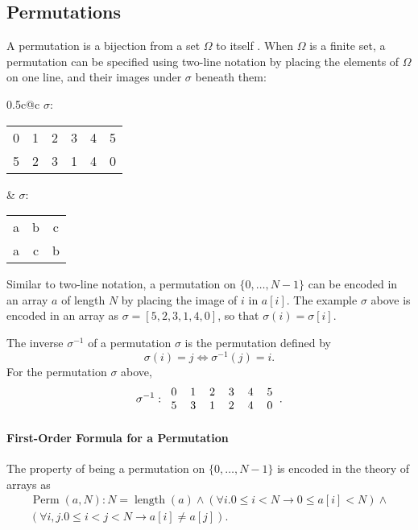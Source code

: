 \documentclass{llncs}
\DeclareMathOperator{\Perm}{Perm}
\DeclareMathOperator{\len}{length}
\begin{document}
\subsection{Permutations}
\label{perms}

A permutation is a bijection from a set \(\Omega\) to itself \cite{dummitfoote}.  When \(\Omega\) is a finite set, a permutation can be specified using two-line notation by placing the elements of \(\Omega\) on one line, and their images under \(\sigma\) beneath them:

\begin{center}
\begin{tabular*}{0.5\textwidth}{c@{\extracolsep{\fill}}c}
\(\sigma\):
\begin{tabular}{cccccc}
0 & 1 & 2 & 3 & 4 & 5\\
5 & 2 & 3 & 1 & 4 & 0
\end{tabular}
&
\(\sigma\):
\begin{tabular}{ccc}
a & b & c\\
a & c & b
\end{tabular}
\end{tabular*}
\end{center}

Similar to two-line notation, a permutation on \(\{0, \dotsc, N-1\}\) can be encoded in an array \(a\) of length \(N\) by placing the image of \(i\) in \(a[i]\).  The example \(\sigma\) above is encoded in an array as \(\sigma = [5, 2, 3, 1, 4, 0]\), so that \(\sigma(i) = \sigma[i]\).

The inverse \(\sigma^{-1}\) of a permutation \(\sigma\) is the permutation defined by
\[\sigma(i) = j \Longleftrightarrow \sigma^{-1}(j) = i.\]
For the permutation \(\sigma\) above,
\[\sigma^{-1}:\begin{tabular}{cccccc}
0 & 1 & 2 & 3 & 4 & 5\\
5 & 3 & 1 & 2 & 4 & 0
\end{tabular}.\]

\paragraph{First-Order Formula for a Permutation}
The property of being a permutation on \(\{0, \dotsc, N-1\}\) is encoded in the theory of arrays as
\begin{multline*}\Perm(a, N): N = \len(a) \wedge (\forall i. 0 \leq i < N \rightarrow 0 \leq a[i] < N) \wedge\\(\forall i,j. 0 \leq i < j < N \rightarrow a[i] \not= a[j]).\end{multline*}
\end{document}
